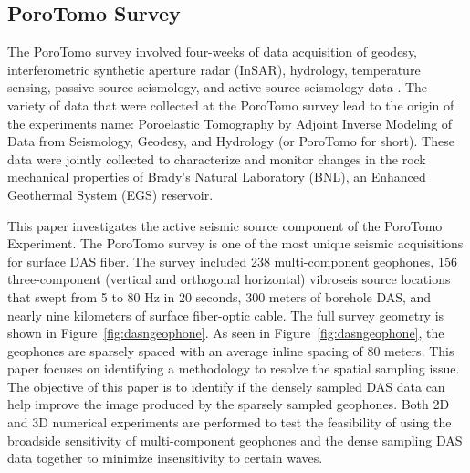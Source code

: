 \subsection{PoroTomo Survey}
The PoroTomo survey involved four-weeks of data acquisition of geodesy, interferometric synthetic aperture radar (InSAR), hydrology, temperature sensing, passive source seismology, and active source seismology data \citep{feigl2017overview,cardiff2018geothermal}. The variety of data that were collected at the PoroTomo survey lead to the origin of the experiments name: Poroelastic Tomography by Adjoint Inverse Modeling of Data from Seismology, Geodesy, and Hydrology (or PoroTomo for short). These data were jointly collected to characterize and monitor changes in the rock mechanical properties of Brady's Natural Laboratory (BNL), an Enhanced Geothermal System (EGS) reservoir.

This paper investigates the active seismic source component of the PoroTomo Experiment. The PoroTomo survey is one of the most unique seismic acquisitions for surface DAS fiber. The survey included 238 multi-component geophones, 156 three-component (vertical and orthogonal horizontal) vibroseis source locations that swept from 5 to 80 Hz in 20 seconds, 300 meters of borehole DAS, and nearly nine kilometers of surface fiber-optic cable. The full survey geometry is shown in Figure~\ref{fig:dasngeophone}. As seen in Figure~\ref{fig:dasngeophone}, the geophones are sparsely spaced with an average inline spacing of 80 meters. This paper focuses on identifying a methodology to resolve the spatial sampling issue. The objective of this paper is to identify if the densely sampled DAS data can help improve the image produced by the sparsely sampled geophones. Both 2D and 3D numerical experiments are performed to test the feasibility of using the broadside sensitivity of multi-component geophones and the dense sampling DAS data together to minimize insensitivity to certain waves.

%
